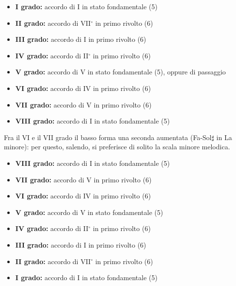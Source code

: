 \begin{regola}
	\label{reg:regola_ottava_minore_asc}
	\begin{itemize}
		\item \textbf{I grado:} accordo di I in stato fondamentale (5)
		\item \textbf{II grado:} accordo di VII$^\circ$ in primo rivolto (6)
		\item \textbf{III grado:} accordo di I in primo rivolto (6)
		\item \textbf{IV grado:} accordo di II$^\circ$ in primo rivolto (6)
		\item \textbf{V grado:} accordo di V in stato fondamentale (5), oppure  di passaggio
		\item \textbf{VI grado:} accordo di IV in primo rivolto (6)
		\item \textbf{VII grado:} accordo di V in primo rivolto (6)
		\item \textbf{VIII grado:} accordo di I in stato fondamentale (5)
	\end{itemize}
	Fra il VI e il VII grado il basso forma una seconda aumentata (Fa-Sol$\sharp$ in La minore): per questo, salendo, si preferisce di solito la scala minore melodica.
\end{regola}

\begin{regola}
	\label{reg:regola_ottava_minore_disc}
	\begin{itemize}
		\item \textbf{VIII grado:} accordo di I in stato fondamentale (5)
		\item \textbf{VII grado:} accordo di V in primo rivolto (6)
		\item \textbf{VI grado:} accordo di IV in primo rivolto (6)
		\item \textbf{V grado:} accordo di V in stato fondamentale (5)
		\item \textbf{IV grado:} accordo di II$^\circ$ in primo rivolto (6)
		\item \textbf{III grado:} accordo di I in primo rivolto (6)
		\item \textbf{II grado:} accordo di VII$^\circ$ in primo rivolto (6)
		\item \textbf{I grado:} accordo di I in stato fondamentale (5)
	\end{itemize}
\end{regola}

